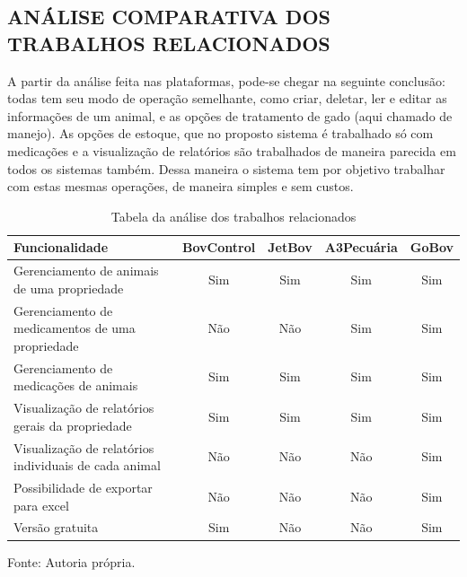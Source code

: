 



\subsection{ANÁLISE COMPARATIVA DOS TRABALHOS RELACIONADOS}

A partir da análise feita nas plataformas, pode-se chegar na seguinte conclusão: todas tem seu modo de operação semelhante, como criar, deletar, ler e editar as informações de um animal, e as opções de tratamento de gado (aqui chamado de manejo). As opções de estoque, que no proposto sistema é trabalhado só com medicações e a visualização de relatórios são trabalhados de maneira parecida em todos os sistemas também. Dessa maneira o sistema tem por objetivo trabalhar com estas mesmas operações, de maneira simples e sem custos.


\begin{table}[H]
	\begin{center}
		\caption{Tabela da análise dos trabalhos relacionados}
		\begin{tabular}{ | p{8cm} |  c | c | c | c |}
			\hline
			Funcionalidade & BovControl & JetBov & A3Pecuária & GoBov \\ \hline
			Gerenciamento de animais de uma propriedade & Sim & Sim & Sim & Sim \\  \hline
			Gerenciamento de medicamentos de uma propriedade & Não & Não & Sim & Sim  \\ \hline
			Gerenciamento de medicações de animais & Sim & Sim & Sim & Sim  \\ \hline
			Visualização de relatórios gerais da propriedade & Sim & Sim & Sim & Sim  \\ \hline
			Visualização de relatórios individuais de cada animal & Não & Não & Não & Sim  \\ \hline
			Possibilidade de exportar para excel & Não & Não & Não & Sim  \\ \hline
			Versão gratuita & Sim & Não & Não & Sim  \\
			\hline
		\end{tabular}
		Fonte: Autoria própria.
	\end{center}
\end{table}


